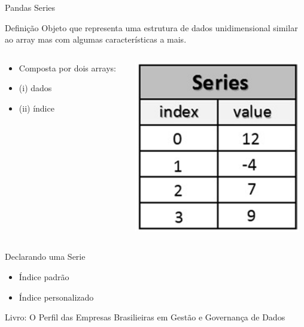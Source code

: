 \begin{frame}[t, fragile]{Pandas Series}
  \begin{block}{Definição}
    Objeto que representa uma estrutura de dados unidimensional similar ao array mas com algumas características a mais.
  \end{block}
  \begin{columns}
    \begin{column}{0.5\textwidth}
        \begin{itemize}
          \item Composta por dois arrays:
          \item (i) dados
          \item (ii) índice
        \end{itemize}
    \end{column}

    \begin{column}{0.5\textwidth}
      \begin{center}
        \includegraphics[scale=.40]{aula-2/figuras/pandas-series-1.png}
      \end{center}
    \end{column}
  \end{columns}
\end{frame}
%
\begin{frame}{Declarando uma Serie}
  \begin{itemize}
    \item Índice padrão
  \end{itemize}
    
  \framebreak
  \begin{itemize}
    \item Índice personalizado
  \end{itemize}
  Livro: O Perfil das Empresas Brasilieiras em Gestão e Governança de Dados
    
\end{frame}
